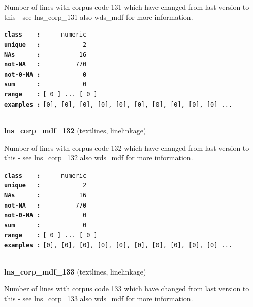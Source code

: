 \documentclass[]{article}
\begin{document}
Number of lines with corpus code 131 which have changed from last
version to this - see lns\_corp\_131 also wds\_mdf for more information.

\textbf{\texttt{class\ \ \ \ :}} \texttt{~~~~~numeric}\\
\textbf{\texttt{unique\ \ \ :}} \texttt{~~~~~~~~~~~2}\\
\textbf{\texttt{NAs\ \ \ \ \ \ :}} \texttt{~~~~~~~~~~16}\\
\textbf{\texttt{not-NA\ \ \ :}} \texttt{~~~~~~~~~770}\\
\textbf{\texttt{not-0-NA\ :}} \texttt{~~~~~~~~~~~0}\\
\textbf{\texttt{sum\ \ \ \ \ \ :}} \texttt{~~~~~~~~~~~0}\\
\textbf{\texttt{range\ \ \ \ :}}
\texttt{{[}\ 0\ {]}\ ...\ {[}\ 0\ {]}}\\
\textbf{\texttt{examples\ :}}
\texttt{{[}0{]},\ {[}0{]},\ {[}0{]},\ {[}0{]},\ {[}0{]},\ {[}0{]},\ {[}0{]},\ {[}0{]},\ {[}0{]},\ {[}0{]}\ ...}\\

~

\textbf{lns\_corp\_mdf\_132} (textlines, linelinkage)

Number of lines with corpus code 132 which have changed from last
version to this - see lns\_corp\_132 also wds\_mdf for more information.

\textbf{\texttt{class\ \ \ \ :}} \texttt{~~~~~numeric}\\
\textbf{\texttt{unique\ \ \ :}} \texttt{~~~~~~~~~~~2}\\
\textbf{\texttt{NAs\ \ \ \ \ \ :}} \texttt{~~~~~~~~~~16}\\
\textbf{\texttt{not-NA\ \ \ :}} \texttt{~~~~~~~~~770}\\
\textbf{\texttt{not-0-NA\ :}} \texttt{~~~~~~~~~~~0}\\
\textbf{\texttt{sum\ \ \ \ \ \ :}} \texttt{~~~~~~~~~~~0}\\
\textbf{\texttt{range\ \ \ \ :}}
\texttt{{[}\ 0\ {]}\ ...\ {[}\ 0\ {]}}\\
\textbf{\texttt{examples\ :}}
\texttt{{[}0{]},\ {[}0{]},\ {[}0{]},\ {[}0{]},\ {[}0{]},\ {[}0{]},\ {[}0{]},\ {[}0{]},\ {[}0{]},\ {[}0{]}\ ...}\\

~

\textbf{lns\_corp\_mdf\_133} (textlines, linelinkage)

Number of lines with corpus code 133 which have changed from last
version to this - see lns\_corp\_133 also wds\_mdf for more information.
\end{document}
